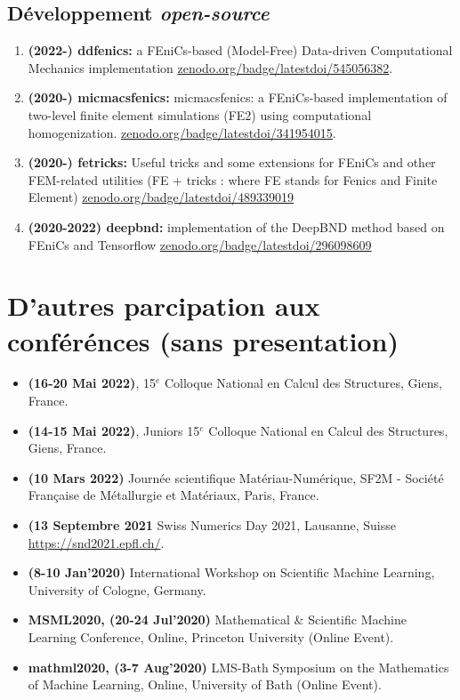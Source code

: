 \documentclass[french]{article}
\begin{document}
\subsection*{Développement \emph{open-source}} \label{sec:libraries}
\begin{enumerate}
	\item \textbf{(2022-) ddfenics:} a FEniCs-based (Model-Free) Data-driven Computational Mechanics implementation \url{zenodo.org/badge/latestdoi/545056382}.
	\item \textbf{(2020-) micmacsfenics:} micmacsfenics: a FEniCs-based implementation of two-level finite element simulations (FE2) using computational homogenization. \url{zenodo.org/badge/latestdoi/341954015}.
	\item \textbf{(2020-) fetricks:} Useful tricks and some extensions for FEniCs and other FEM-related utilities (FE + tricks : where FE stands for Fenics and Finite Element) \url{zenodo.org/badge/latestdoi/489339019}
	\item \textbf{(2020-2022) deepbnd:} implementation of the DeepBND method based on FEniCs and Tensorflow \url{zenodo.org/badge/latestdoi/296098609}
\end{enumerate}



\section*{D'autres parcipation aux conférénces (sans presentation)}
\begin{itemize} 
\item \textbf{(16-20 Mai 2022)}, 15$^{e}$ Colloque National en Calcul des Structures, Giens, France.
\item \textbf{(14-15 Mai 2022)}, Juniors 15$^{e}$ Colloque National en Calcul des Structures, Giens, France.
\item \textbf{(10 Mars 2022)} Journée scientifique Matériau-Numérique, SF2M - Société  Française de Métallurgie et Matériaux, Paris, France.
\item \textbf{(13 Septembre 2021} Swiss Numerics Day 2021, Lausanne, Suisse  \url{https://snd2021.epfl.ch/}. 
\item \textbf{(8-10 Jan'2020)} International Workshop on Scientific Machine Learning, University of Cologne, Germany.
\item \textbf{MSML2020, (20-24 Jul'2020)}  Mathematical \& Scientific Machine Learning Conference, Online, Princeton University (Online Event).
\item \textbf{mathml2020, (3-7 Aug'2020)}  LMS-Bath Symposium on the Mathematics of Machine Learning, Online, University of Bath (Online Event).
\end{itemize}
\end{document}
